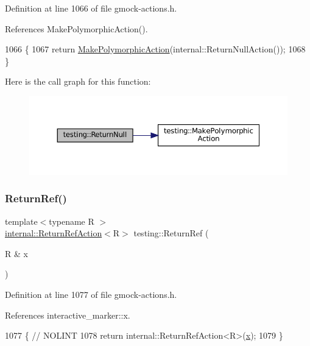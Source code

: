 Definition at line 1066 of file gmock-\/actions.\+h.



References Make\+Polymorphic\+Action().


\begin{DoxyCode}
1066                                                                 \{
1067   \textcolor{keywordflow}{return} \hyperlink{namespacetesting_a36bd06c5ea972c6df0bd9f40a7a94c65}{MakePolymorphicAction}(internal::ReturnNullAction());
1068 \}
\end{DoxyCode}
Here is the call graph for this function\+:
\nopagebreak
\begin{figure}[H]
\begin{center}
\leavevmode
\includegraphics[width=350pt]{namespacetesting_aa0331596e269114da101f810d3a1b88b_cgraph}
\end{center}
\end{figure}
\mbox{\label{namespacetesting_a18eda8fe9c89ee856c199a2e04ca1641}} 
\subsubsection{\texorpdfstring{Return\+Ref()}{ReturnRef()}}
{\footnotesize\ttfamily template$<$typename R $>$ \\
\hyperlink{classtesting_1_1internal_1_1ReturnRefAction}{internal\+::\+Return\+Ref\+Action}$<$R$>$ testing\+::\+Return\+Ref (\begin{DoxyParamCaption}\item[{R \&}]{x }\end{DoxyParamCaption})\hspace{0.3cm}{\ttfamily [inline]}}



Definition at line 1077 of file gmock-\/actions.\+h.



References interactive\+\_\+marker\+::x.


\begin{DoxyCode}
1077                                                   \{  \textcolor{comment}{// NOLINT}
1078   \textcolor{keywordflow}{return} internal::ReturnRefAction<R>(\hyperlink{namespaceinteractive__marker_acda52804aef30b460a72fb21ee01d69d}{x});
1079 \}
\end{DoxyCode}
\mbox{\label{namespacetesting_ac1b75444c89371dc25ebcfcc48336201}} 
